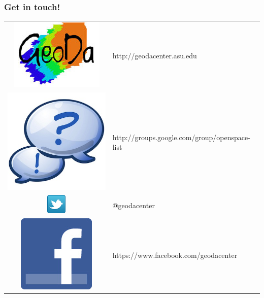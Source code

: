 \documentclass[nototal]{beamer}
\begin{document}
\begin{frame}
	\frametitle{Get in touch!}
  \begin{table}
  \centering
  \begin{tabular}{c l}
   \includegraphics[scale=0.20]{figs/geoda_logo.png}  & http://geodacenter.asu.edu \\
   \includegraphics[scale=0.10]{figs/google-groups-logo.png}  & http://groups.google.com/group/openspace-list \\
   \includegraphics[scale=0.40]{figs/twitter.png}  & @geodacenter \\
   \includegraphics[scale=0.10]{figs/f_logo.png}  & https://www.facebook.com/geodacenter \\
  \end{tabular}
  \end{table}
 \end{frame}
\end{document}
